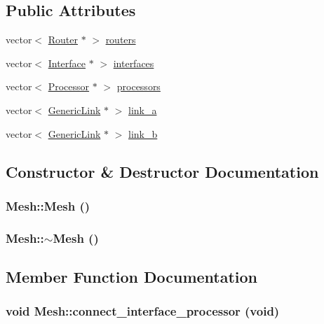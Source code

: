 \subsection*{Public Attributes}
\begin{CompactItemize}
\item 
vector$<$ \hyperlink{classRouter}{Router} $\ast$ $>$ \hyperlink{classMesh_da66e4e75f4e50237af30d495248cca2}{routers}
\item 
vector$<$ \hyperlink{classInterface}{Interface} $\ast$ $>$ \hyperlink{classMesh_9ebde4264da1ba6e8f24bd2a24d05ef8}{interfaces}
\item 
vector$<$ \hyperlink{classProcessor}{Processor} $\ast$ $>$ \hyperlink{classMesh_e3531860febe9e7194b5d44ac1c1b2d8}{processors}
\item 
vector$<$ \hyperlink{classGenericLink}{GenericLink} $\ast$ $>$ \hyperlink{classMesh_25aed9e44396cd39a521e647d8e95ed2}{link\_\-a}
\item 
vector$<$ \hyperlink{classGenericLink}{GenericLink} $\ast$ $>$ \hyperlink{classMesh_8afcc482b97d3820e8249750c8a214c2}{link\_\-b}
\end{CompactItemize}


\subsection{Constructor \& Destructor Documentation}
\hypertarget{classMesh_2af137f1571af89172b9c102302c416b}{
\subsubsection[{Mesh}]{\setlength{\rightskip}{0pt plus 5cm}Mesh::Mesh ()}}
\label{classMesh_2af137f1571af89172b9c102302c416b}


\hypertarget{classMesh_5efe4da1a4c0971cfb037bd70304c303}{
\subsubsection[{$\sim$Mesh}]{\setlength{\rightskip}{0pt plus 5cm}Mesh::$\sim$Mesh ()}}
\label{classMesh_5efe4da1a4c0971cfb037bd70304c303}




\subsection{Member Function Documentation}
\hypertarget{classMesh_9dfad9769d936905f5d8b0e4ffad6743}{
\subsubsection[{connect\_\-interface\_\-processor}]{\setlength{\rightskip}{0pt plus 5cm}void Mesh::connect\_\-interface\_\-processor (void)}}
\label{classMesh_9dfad9769d936905f5d8b0e4ffad6743}


